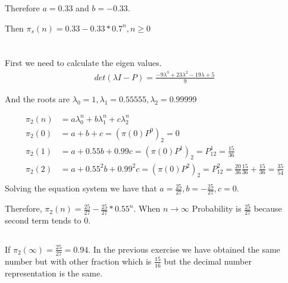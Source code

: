 \documentclass[12pt, a4paper]{article}
\begin{document}
Therefore $a = 0.33$ and $b = -0.33$.

Then $\pi_s(n) = 0.33 - 0.33 * 0.7^n, n \geq 0$

\section{}

First we need to calculate the eigen values.
\begin{subequations}
  \begin{align}
    det(\lambda I - P) = \frac{-9\lambda^3+23\lambda^2-19\lambda+5}{9}
  \end{align}
\end{subequations}

And the roots are $\lambda_0 = 1, \lambda_1 = 0.55555, \lambda_2 = 0.99999$

\begin{subequations}
  \begin{align}
    \pi_2(n) &= a \lambda_0^n + b \lambda_1^n + c \lambda_2^n\\
    \pi_2(0) &= a + b + c = (\pi(0)P^0)_2 = 0\\
    \pi_2(1) &= a + 0.55 b + 0.99 c = (\pi(0)P^1)_2 = P_{12}^1 = \frac{15}{36}\\
    \pi_2(2) &= a + 0.55^2 b + 0.99^2 c = (\pi(0)P^2)_2 = P_{12}^2 = \frac{20}{36}\frac{15}{36} + \frac{15}{36} = \frac{35}{54}\\
  \end{align}
\end{subequations}
Solving the equation system we have that $a = \frac{25}{27}, b = -\frac{25}{27}, c = 0$.

Therefore, $\pi_2(n) = \frac{25}{27} - \frac{25}{27} * 0.55^n $. When $n \rightarrow \infty$ Probability is $\frac{25}{27}$ because second term tends to $0$.

\subsection{}
If $\pi_2(\infty) = \frac{25}{27} = 0.94$. In the previous exercise we have obtained the same number but with other fraction which is $\frac{15}{16}$ but the decimal number representation is the same.
\end{document}
